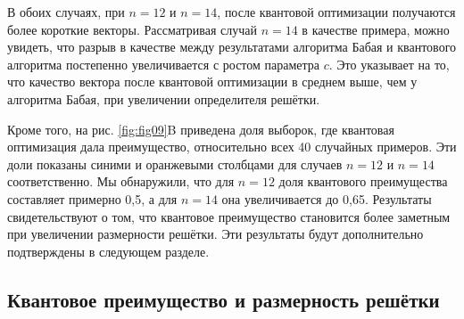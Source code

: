 В обоих случаях, при $n = 12$ и $n = 14$, после квантовой оптимизации
получаются более короткие векторы. Рассматривая случай $n = 14$ в качестве
примера, можно увидеть, что разрыв в качестве между результатами алгоритма
Бабая и квантового алгоритма постепенно увеличивается с ростом параметра $c$.
Это указывает на то, что качество вектора после квантовой оптимизации в среднем
выше, чем у алгоритма Бабая, при увеличении определителя решётки.

Кроме того, на рис. \ref{fig:fig09}B приведена доля выборок, где квантовая
оптимизация дала преимущество, относительно всех 40 случайных примеров. Эти
доли показаны синими и оранжевыми столбцами для случаев $n = 12$ и $n = 14$
соответственно. Мы обнаружили, что для $n = 12$ доля квантового преимущества
составляет примерно 0{,}5, а для $n = 14$ она увеличивается до 0{,}65.
Результаты свидетельствуют о том, что квантовое преимущество становится более
заметным при увеличении размерности решётки. Эти результаты будут дополнительно
подтверждены в следующем разделе.

\subsection*{Квантовое преимущество и размерность решётки}

